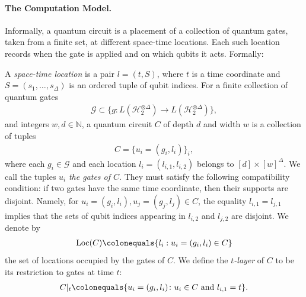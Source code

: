 
\label{subsection:model}
\newcommand{\comDAG}{\pi_{C[\mathcal{E}]}} 
\paragraph{The Computation Model.} Informally, a quantum circuit is a placement of a collection of quantum gates, taken from a finite set, at different space-time locations. Each such location records when the gate is applied and on which qubits it acts. Formally:

\begin{definition}
  \label{def:quantcirc}
  A \emph{space-time location} is a pair $l=(t,S)$, where $t$ is a time coordinate and $S=(s_{1},\ldots,s_{\Delta})$ is an ordered tuple of qubit indices. For a finite collection of quantum gates 
  \begin{equation*}
    \begin{split}
      \mathcal{G} \subset \Big\{ g \colon L(\mathcal{H}_{2}^{\otimes \Delta}) \to L(\mathcal{H}_{2}^{\otimes \Delta}) \Big\},
    \end{split}
  \end{equation*}
  and integers $w,d\in\mathbb{N}$, a quantum circuit $C$ of depth $d$ and width $w$ is a collection of tuples
  \begin{equation*}
    \begin{split}
      C=\{u_i=(g_i,l_i)\}_i,
    \end{split}
  \end{equation*}
  where each $g_i\in\mathcal{G}$ and each location $l_i=(l_{i,1},l_{i,2})$ belongs to $[d]\times [w]^{\Delta}$. We call the tuples $u_i$ \textit{the gates of $C$}. They must satisfy the following compatibility condition: if two gates have the same time coordinate, then their supports are disjoint. Namely, for $u_i=(g_i,l_i),u_j=(g_j,l_j)\in C$, the equality $l_{i,1}=l_{j,1}$ implies that the sets of qubit indices appearing in $l_{i,2}$ and $l_{j,2}$ are disjoint. We denote by
  \begin{equation*}
    \begin{split}
      \operatorname{Loc}(C) \colonequals \{l_i : u_i=(g_i,l_i)\in C\}
    \end{split}
  \end{equation*}
  the set of locations occupied by the gates of $C$. We define the \textit{$t$-layer} of $C$ to be its restriction to gates at time $t$:
  \begin{equation*}
    \begin{split}
      C|_{t} \colonequals \{u_i=(g_i,l_i)\colon u_i\in C \text{ and } l_{i,1}=t\}.
    \end{split}
  \end{equation*}
\end{definition}
